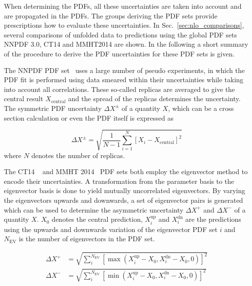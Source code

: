 When determining the PDFs, all these uncertainties are taken into account and
are propagated in the PDFs. The groups deriving the PDF sets provide
prescriptions how to evaluate these uncertainties. In
Sec.~\ref{sec:nlo_comparisons}, several comparisons of unfolded data to
predictions using the global PDF sets NNPDF 3.0, CT14 and MMHT2014 are shown. In
the following a short summary of the procedure to derive the PDF uncertainties
for these PDF sets is given.

The NNPDF PDF set~\cite{Ball:2014uwa} uses a large number of pseudo experiments,
in which the PDF fit is performed using data smeared within their uncertainties
while taking into account all correlations. These so-called replicas are
averaged to give the central result $X_\mathrm{central}$ and the spread of the
replicas determines the uncertainty. The symmetric PDF uncertainty $\Delta
X^\pm$ of a quantity $X$, which can be a cross section calculation or even the
PDF itself is expressed as

\begin{equation*}
    \Delta X^{\pm} = \sqrt{\frac{1}{N-1} \sum_{i=1}^N \left[ X_{i} - X_{\mathrm{central}} \right]^2}
\end{equation*}
where $N$ denotes the number of replicas.

The CT14 ~\cite{Dulat:2015mca} and MMHT 2014~\cite{Harland-Lang:2014zoa} PDF
sets both employ the eigenvector method to encode their uncertainties. A
transformation from the parameter basis to the eigenvector basis is done to
yield mutually uncorrelated eigenvectors. By varying the eigenvectors upwards
and downwards, a set of eigenvector pairs is generated which can be used to
determine the asymmetric uncertainty $\Delta X^+$ and $\Delta X^-$ of a quantity
$X$. $X_0$ denotes the central prediction, $X_i^{\mathrm{up}}$ and
$X_i^{\mathrm{dn}}$ are the predictions using the upwards and downwards
variation of the eigenvector PDF set $i$ and $N_{\mathrm{EV}}$ is the number of
eigenvectors in the PDF set.

\begin{equation*}
\begin{aligned}
    \Delta X^+ &= \sqrt{\sum_i^{N_{\mathrm{EV}}} \left[ \max(X_i^{\mathrm{up}}
    -X_0, X_i^{\mathrm{dn}} - X_0, 0)\right]^2}\\
\Delta X^- &= \sqrt{\sum_i^{N_{\mathrm{EV}}} \left[ \min(X_i^{\mathrm{up}} - X_0, X_i^{\mathrm{dn}} - X_0,0)\right]^2}
\end{aligned}
\end{equation*}

